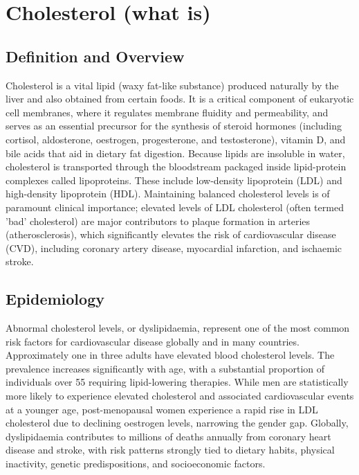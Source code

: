 \chapter{Cholesterol (what is)}

\section*{Definition and Overview}
Cholesterol is a vital lipid (waxy fat-like substance) produced naturally by the liver and also obtained from certain foods. It is a critical component of eukaryotic cell membranes, where it regulates membrane fluidity and permeability, and serves as an essential precursor for the synthesis of steroid hormones (including cortisol, aldosterone, oestrogen, progesterone, and testosterone), vitamin D, and bile acids that aid in dietary fat digestion. Because lipids are insoluble in water, cholesterol is transported through the bloodstream packaged inside lipid-protein complexes called lipoproteins. These include low-density lipoprotein (LDL) and high-density lipoprotein (HDL). Maintaining balanced cholesterol levels is of paramount clinical importance; elevated levels of LDL cholesterol (often termed 'bad' cholesterol) are major contributors to plaque formation in arteries (atherosclerosis), which significantly elevates the risk of cardiovascular disease (CVD), including coronary artery disease, myocardial infarction, and ischaemic stroke.

\section*{Epidemiology}
Abnormal cholesterol levels, or dyslipidaemia, represent one of the most common risk factors for cardiovascular disease globally and in many countries. Approximately one in three adults have elevated blood cholesterol levels. The prevalence increases significantly with age, with a substantial proportion of individuals over 55 requiring lipid-lowering therapies. While men are statistically more likely to experience elevated cholesterol and associated cardiovascular events at a younger age, post-menopausal women experience a rapid rise in LDL cholesterol due to declining oestrogen levels, narrowing the gender gap. Globally, dyslipidaemia contributes to millions of deaths annually from coronary heart disease and stroke, with risk patterns strongly tied to dietary habits, physical inactivity, genetic predispositions, and socioeconomic factors.

